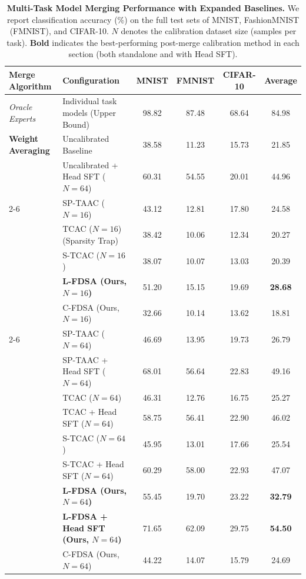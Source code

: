 \documentclass{article}
\begin{document}
\begin{table}[t]
\caption{\textbf{Multi-Task Model Merging Performance with Expanded Baselines.} We report classification accuracy (\%) on the full test sets of MNIST, FashionMNIST (FMNIST), and CIFAR-10. $N$ denotes the calibration dataset size (samples per task). \textbf{Bold} indicates the best-performing post-merge calibration method in each section (both standalone and with Head SFT).}
\label{tab:results}
\vskip 0.15in
\begin{center}
\begin{small}
\begin{sc}
\begin{tabular}{llcccc}
\toprule
Merge Algorithm & Configuration & MNIST & FMNIST & CIFAR-10 & Average \\
\midrule
\textit{Oracle Experts} & Individual task models (Upper Bound) & 98.82 & 87.48 & 68.64 & 84.98 \\
\midrule
\textbf{Weight Averaging} & Uncalibrated Baseline & 38.58 & 11.23 & 15.73 & 21.85 \\
& Uncalibrated + Head SFT ($N=64$) & 60.31 & 54.55 & 20.01 & 44.96 \\
\cmidrule{2-6}
& SP-TAAC ($N=16$) & 43.12 & 12.81 & 17.80 & 24.58 \\
& TCAC ($N=16$) (Sparsity Trap) & 38.42 & 10.06 & 12.34 & 20.27 \\
& S-TCAC ($N=16$) & 38.07 & 10.07 & 13.03 & 20.39 \\
& \textbf{L-FDSA (Ours, $N=16$)} & 51.20 & 15.15 & 19.69 & \textbf{28.68} \\
& C-FDSA (Ours, $N=16$) & 32.66 & 10.14 & 13.62 & 18.81 \\
\cmidrule{2-6}
& SP-TAAC ($N=64$) & 46.69 & 13.95 & 19.73 & 26.79 \\
& SP-TAAC + Head SFT ($N=64$) & 68.01 & 56.64 & 22.83 & 49.16 \\
& TCAC ($N=64$) & 46.31 & 12.76 & 16.75 & 25.27 \\
& TCAC + Head SFT ($N=64$) & 58.75 & 56.41 & 22.90 & 46.02 \\
& S-TCAC ($N=64$) & 45.95 & 13.01 & 17.66 & 25.54 \\
& S-TCAC + Head SFT ($N=64$) & 60.29 & 58.00 & 22.93 & 47.07 \\
& \textbf{L-FDSA (Ours, $N=64$)} & 55.45 & 19.70 & 23.22 & \textbf{32.79} \\
& \textbf{L-FDSA + Head SFT (Ours, $N=64$)} & 71.65 & 62.09 & 29.75 & \textbf{54.50} \\
& C-FDSA (Ours, $N=64$) & 44.22 & 14.07 & 15.79 & 24.69 \\

\end{tabular}
\end{sc}
\end{small}
\end{center}
\end{table}
\end{document}
